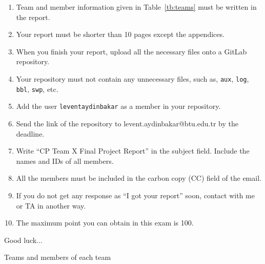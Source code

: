 \documentclass[addpoints]{exam}
\begin{document}
\begin{flushleft}
{{{\begin{enumerate}
    \item Team and member information given in Table~\ref{tb:teams} must be written in the report.
    \item Your report must be shorter than 10 pages except the appendices.
    \item When you finish your report, upload all the necessary files onto a GitLab repository.
    \item Your repository must not contain any unnecessary files, such as, \texttt{aux}, \texttt{log}, \texttt{bbl}, \texttt{swp}, etc.
    \item Add the user \texttt{leventaydinbakar} as a member in your repository.
    \item Send the link of the repository to levent.aydinbakar@btu.edu.tr by the deadline. 
    \item Write ``CP Team X Final Project Report'' in the subject field. Include the names and IDs of all members.
    \item All the members must be included in the carbon copy (CC) field of the email. 
    \item If you do not get any response as ``I got your report'' soon, contact with me or TA in another way.
    \item The maximum point you can obtain in this exam is 100. 
\end{enumerate}}}}

\vspace{2cm}

Good luck...

\end{flushleft}

\newpage


\begin{table}
\caption{Teams and members of each team}
\label{tb:teams}
\end{table}
\end{document}

